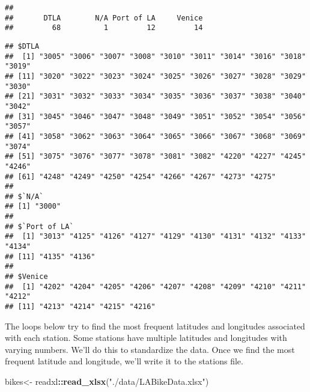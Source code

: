 \documentclass[]{article}
\newenvironment{Shaded}{\begin{snugshade}}{\end{snugshade}}
\newcommand{\KeywordTok}[1]{\textcolor[rgb]{0.13,0.29,0.53}{\textbf{#1}}}
\newcommand{\StringTok}[1]{\textcolor[rgb]{0.31,0.60,0.02}{#1}}
\newcommand{\ControlFlowTok}[1]{\textcolor[rgb]{0.13,0.29,0.53}{\textbf{#1}}}
\newcommand{\OperatorTok}[1]{\textcolor[rgb]{0.81,0.36,0.00}{\textbf{#1}}}
\newcommand{\NormalTok}[1]{#1}
\begin{document}
\begin{verbatim}
## 
##       DTLA        N/A Port of LA     Venice 
##         68          1         12         14
\end{verbatim}

\begin{Shaded}
\end{Shaded}

\begin{verbatim}
## $DTLA
##  [1] "3005" "3006" "3007" "3008" "3010" "3011" "3014" "3016" "3018" "3019"
## [11] "3020" "3022" "3023" "3024" "3025" "3026" "3027" "3028" "3029" "3030"
## [21] "3031" "3032" "3033" "3034" "3035" "3036" "3037" "3038" "3040" "3042"
## [31] "3045" "3046" "3047" "3048" "3049" "3051" "3052" "3054" "3056" "3057"
## [41] "3058" "3062" "3063" "3064" "3065" "3066" "3067" "3068" "3069" "3074"
## [51] "3075" "3076" "3077" "3078" "3081" "3082" "4220" "4227" "4245" "4246"
## [61] "4248" "4249" "4250" "4254" "4266" "4267" "4273" "4275"
## 
## $`N/A`
## [1] "3000"
## 
## $`Port of LA`
##  [1] "3013" "4125" "4126" "4127" "4129" "4130" "4131" "4132" "4133" "4134"
## [11] "4135" "4136"
## 
## $Venice
##  [1] "4202" "4204" "4205" "4206" "4207" "4208" "4209" "4210" "4211" "4212"
## [11] "4213" "4214" "4215" "4216"
\end{verbatim}

The loops below try to find the most frequent latitudes and longitudes
associated with each station. Some stations have multiple latitudes and
longitudes with varying numbers. We'll do this to standardize the data.
Once we find the most frequent latitude and longitude, we'll write it to
the stations file.

\begin{Shaded}
\begin{Highlighting}[]
\NormalTok{bikes<-}\StringTok{ }\NormalTok{readxl}\OperatorTok{::}\KeywordTok{read_xlsx}\NormalTok{(}\StringTok{"./data/LABikeData.xlsx"}\NormalTok{)}
\end{Highlighting}
\end{Shaded}
\end{document}
